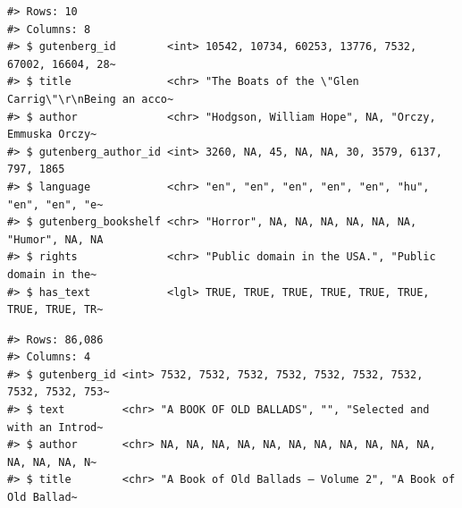 \documentclass[
  letterpaper,
]{scrbook}
\newenvironment{Shaded}{\begin{snugshade}}{\end{snugshade}}
\newcommand{\AttributeTok}[1]{\textcolor[rgb]{0.00,0.00,0.00}{#1}}
\newcommand{\CommentTok}[1]{\textcolor[rgb]{0.00,0.00,0.00}{\textit{#1}}}
\newcommand{\FunctionTok}[1]{\textcolor[rgb]{0.00,0.00,0.00}{#1}}
\newcommand{\NormalTok}[1]{\textcolor[rgb]{0.00,0.00,0.00}{#1}}
\newcommand{\OtherTok}[1]{\textcolor[rgb]{0.00,0.00,0.00}{#1}}
\newcommand{\SpecialCharTok}[1]{\textcolor[rgb]{0.00,0.00,0.00}{#1}}
\newcommand{\StringTok}[1]{\textcolor[rgb]{0.00,0.00,0.00}{#1}}
\begin{document}
\begin{verbatim}
#> Rows: 10
#> Columns: 8
#> $ gutenberg_id        <int> 10542, 10734, 60253, 13776, 7532, 67002, 16604, 28~
#> $ title               <chr> "The Boats of the \"Glen Carrig\"\r\nBeing an acco~
#> $ author              <chr> "Hodgson, William Hope", NA, "Orczy, Emmuska Orczy~
#> $ gutenberg_author_id <int> 3260, NA, 45, NA, NA, 30, 3579, 6137, 797, 1865
#> $ language            <chr> "en", "en", "en", "en", "en", "hu", "en", "en", "e~
#> $ gutenberg_bookshelf <chr> "Horror", NA, NA, NA, NA, NA, NA, "Humor", NA, NA
#> $ rights              <chr> "Public domain in the USA.", "Public domain in the~
#> $ has_text            <lgl> TRUE, TRUE, TRUE, TRUE, TRUE, TRUE, TRUE, TRUE, TR~
\end{verbatim}

\begin{Shaded}
\end{Shaded}

\begin{Shaded}
\end{Shaded}

\begin{verbatim}
#> Rows: 86,086
#> Columns: 4
#> $ gutenberg_id <int> 7532, 7532, 7532, 7532, 7532, 7532, 7532, 7532, 7532, 753~
#> $ text         <chr> "A BOOK OF OLD BALLADS", "", "Selected and with an Introd~
#> $ author       <chr> NA, NA, NA, NA, NA, NA, NA, NA, NA, NA, NA, NA, NA, NA, N~
#> $ title        <chr> "A Book of Old Ballads — Volume 2", "A Book of Old Ballad~
\end{verbatim}
\end{document}
